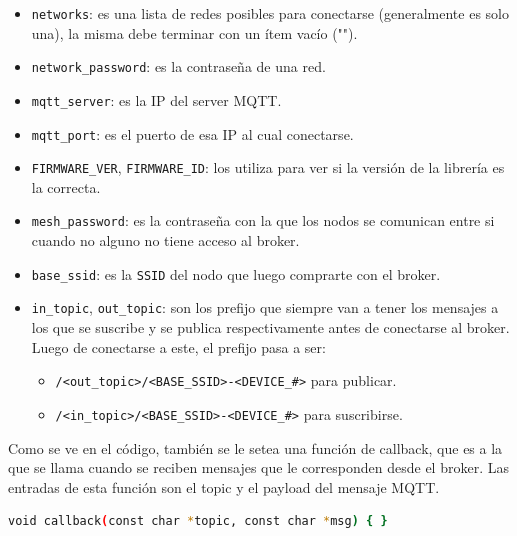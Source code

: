 \begin{itemize}
  \item \lstinline[columns=fixed]{networks}: es una lista de redes posibles para conectarse (generalmente es solo una), la misma debe terminar con un ítem vacío ("").
  \item \lstinline[columns=fixed]{network_password}: es la contraseña de una red.
  \item \lstinline[columns=fixed]{mqtt_server}: es la IP del server MQTT.
  \item \lstinline[columns=fixed]{mqtt_port}: es el puerto de esa IP al cual conectarse.
  \item \lstinline[columns=fixed]{FIRMWARE_VER}, \lstinline[columns=fixed]{FIRMWARE_ID}: los utiliza para ver si la versión de la librería es la correcta.
  \item \lstinline[columns=fixed]{mesh_password}: es la contraseña con la que los nodos se comunican entre si cuando no alguno no tiene acceso al broker.
  \item \lstinline[columns=fixed]{base_ssid}: es la \lstinline[columns=fixed]{SSID} del nodo que luego comprarte con el broker.
  \item \lstinline[columns=fixed]{in_topic}, \lstinline[columns=fixed]{out_topic}: son los prefijo que siempre van a tener los mensajes a los que se suscribe y se publica respectivamente antes de conectarse al broker. Luego de conectarse a este, el prefijo pasa a ser:
  \begin{itemize}
    \item \lstinline[columns=fixed]{/<out_topic>/<BASE_SSID>-<DEVICE_#>} para publicar.
    \item \lstinline[columns=fixed]{/<in_topic>/<BASE_SSID>-<DEVICE_#>} para suscribirse.
  \end{itemize}
\end{itemize}

Como se ve en el código, también se le setea una función de callback, que es a la que se llama cuando se reciben mensajes que le corresponden desde el broker. Las entradas de esta función son el topic y el payload del mensaje MQTT. 

\begin{lstlisting}[language=bash]
void callback(const char *topic, const char *msg) { }
\end{lstlisting}

